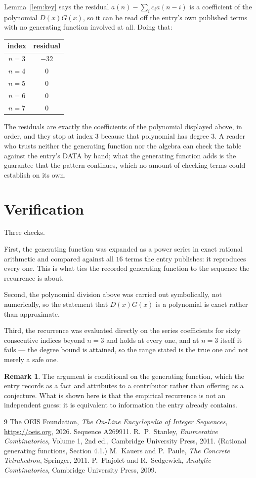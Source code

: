 \documentclass[11pt,a4paper]{article}
\theoremstyle{plain}
\theoremstyle{definition}
\newtheorem{remark}[theorem]{Remark}
\begin{document}
Lemma~\ref{lem:key} says the residual $a(n)-\sum_ic_ia(n-i)$ is a coefficient of the
polynomial $D(x)G(x)$, so it can be read off the entry's own published terms with no
generating function involved at all. Doing that:
\begin{center}
\begin{tabular}{cc}
index & residual \\ \hline
$n=3$ & $-32$ \\
$n=4$ & $0$ \\
$n=5$ & $0$ \\
$n=6$ & $0$ \\
$n=7$ & $0$
\end{tabular}
\end{center}
The residuals are exactly the coefficients of the polynomial displayed above, in order, and
they stop at index $3$ because that polynomial has degree $3$. A reader who trusts
neither the generating function nor the algebra can check the table against the entry's DATA
by hand; what the generating function adds is the guarantee that the pattern continues, which
no amount of checking terms could establish on its own.

\section{Verification}

Three checks.

First, the generating function was expanded as a power series in exact rational arithmetic and
compared against all $16$ terms the entry publishes: it reproduces every one. This is
what ties the recorded generating function to the sequence the recurrence is about.

Second, the polynomial division above was carried out symbolically, not numerically, so the
statement that $D(x)G(x)$ is a polynomial is exact rather than approximate.

Third, the recurrence was evaluated directly on the series coefficients for sixty consecutive
indices beyond $n=3$ and holds at every one, and at $n=3$ itself it fails --- the
degree bound is attained, so the range stated is the true one and not merely a safe one.

\begin{remark}
The argument is conditional on the generating function, which the entry records as a fact and
attributes to a contributor rather than offering as a conjecture. What is shown here is that
the empirical recurrence is not an independent guess: it is equivalent to information the
entry already contains.
\end{remark}

\begin{thebibliography}{9}
 The OEIS Foundation, \emph{The On-Line Encyclopedia of Integer
Sequences}, \url{https://oeis.org}, 2026. Sequence A269911.
 R.~P.~Stanley, \emph{Enumerative Combinatorics}, Volume 1, 2nd ed.,
Cambridge University Press, 2011. (Rational generating functions, Section 4.1.)
 M.~Kauers and P.~Paule, \emph{The Concrete Tetrahedron}, Springer, 2011.
 P.~Flajolet and R.~Sedgewick, \emph{Analytic Combinatorics}, Cambridge
University Press, 2009.
\end{thebibliography}
\end{document}
